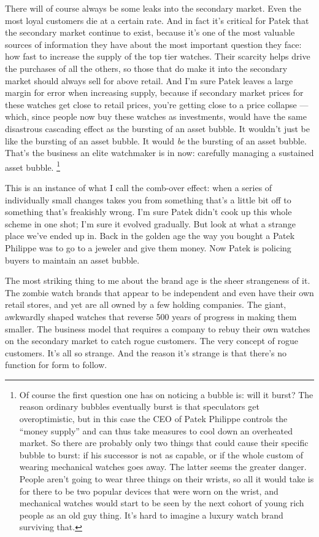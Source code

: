 There will of course always be some leaks into the secondary market.
Even the most loyal customers die at a certain rate. And in fact it's
critical for Patek that the secondary market continue to exist, because
it's one of the most valuable sources of information they have about the
most important question they face: how fast to increase the supply of
the top tier watches. Their scarcity helps drive the purchases of all
the others, so those that do make it into the secondary market should
always sell for above retail. And I'm sure Patek leaves a large margin
for error when increasing supply, because if secondary market prices for
these watches get close to retail prices, you're getting close to a
price collapse --- which, since people now buy these watches as
investments, would have the same disastrous cascading effect as the
bursting of an asset bubble. It wouldn't just be like the bursting of an
asset bubble. It would \emph{be} the bursting of an asset bubble. That's
the business an elite watchmaker is in now: carefully managing a
sustained asset bubble. \footnote{Of course the first question one has on noticing a bubble is:
will it burst? The reason ordinary bubbles eventually burst is that
speculators get overoptimistic, but in this case the CEO of Patek
Philippe controls the ``money supply'' and can thus take measures to
cool down an overheated market. So there are probably only two things
that could cause their specific bubble to burst: if his successor is not
as capable, or if the whole custom of wearing mechanical watches goes
away. The latter seems the greater danger. People aren't going to wear
three things on their wrists, so all it would take is for there to be
two popular devices that were worn on the wrist, and mechanical watches
would start to be seen by the next cohort of young rich people as an old
guy thing. It's hard to imagine a luxury watch brand surviving that.}

This is an instance of what I call the comb-over effect: when a series
of individually small changes takes you from something that's a little
bit off to something that's freakishly wrong. I'm sure Patek didn't cook
up this whole scheme in one shot; I'm sure it evolved gradually. But
look at what a strange place we've ended up in. Back in the golden age
the way you bought a Patek Philippe was to go to a jeweler and give them
money. Now Patek is policing buyers to maintain an asset bubble.

The most striking thing to me about the brand age is the sheer
strangeness of it. The zombie watch brands that appear to be independent
and even have their own retail stores, and yet are all owned by a few
holding companies. The giant, awkwardly shaped watches that reverse 500
years of progress in making them smaller. The business model that
requires a company to rebuy their own watches on the secondary market to
catch rogue customers. The very concept of rogue customers. It's all so
strange. And the reason it's strange is that there's no function for
form to follow.

